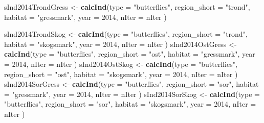 \documentclass[]{article}
\newenvironment{Shaded}{\begin{snugshade}}{\end{snugshade}}
\newcommand{\KeywordTok}[1]{\textcolor[rgb]{0.13,0.29,0.53}{\textbf{#1}}}
\newcommand{\DataTypeTok}[1]{\textcolor[rgb]{0.13,0.29,0.53}{#1}}
\newcommand{\DecValTok}[1]{\textcolor[rgb]{0.00,0.00,0.81}{#1}}
\newcommand{\StringTok}[1]{\textcolor[rgb]{0.31,0.60,0.02}{#1}}
\newcommand{\NormalTok}[1]{#1}
\begin{document}
\begin{Shaded}
\begin{Highlighting}[]
\NormalTok{sInd2014TrondGress <-}\StringTok{ }\KeywordTok{calcInd}\NormalTok{(}\DataTypeTok{type =} \StringTok{"butterflies"}\NormalTok{,}
                              \DataTypeTok{region_short =} \StringTok{"trond"}\NormalTok{,}
                              \DataTypeTok{habitat =} \StringTok{"gressmark"}\NormalTok{,}
                              \DataTypeTok{year =} \DecValTok{2014}\NormalTok{,}
                              \DataTypeTok{nIter =}\NormalTok{ nIter}
\NormalTok{                              )}
       
\NormalTok{sInd2014TrondSkog <-}\StringTok{ }\KeywordTok{calcInd}\NormalTok{(}\DataTypeTok{type =} \StringTok{"butterflies"}\NormalTok{,}
                              \DataTypeTok{region_short =} \StringTok{"trond"}\NormalTok{,}
                              \DataTypeTok{habitat =} \StringTok{"skogsmark"}\NormalTok{,}
                              \DataTypeTok{year =} \DecValTok{2014}\NormalTok{,}
                              \DataTypeTok{nIter =}\NormalTok{ nIter}
\NormalTok{                              )}
\NormalTok{sInd2014OstGress <-}\StringTok{ }\KeywordTok{calcInd}\NormalTok{(}\DataTypeTok{type =} \StringTok{"butterflies"}\NormalTok{,}
                              \DataTypeTok{region_short =} \StringTok{"ost"}\NormalTok{,}
                              \DataTypeTok{habitat =} \StringTok{"gressmark"}\NormalTok{,}
                              \DataTypeTok{year =} \DecValTok{2014}\NormalTok{,}
                              \DataTypeTok{nIter =}\NormalTok{ nIter}
\NormalTok{                              )}
\NormalTok{sInd2014OstSkog <-}\StringTok{ }\KeywordTok{calcInd}\NormalTok{(}\DataTypeTok{type =} \StringTok{"butterflies"}\NormalTok{,}
                              \DataTypeTok{region_short =} \StringTok{"ost"}\NormalTok{,}
                              \DataTypeTok{habitat =} \StringTok{"skogsmark"}\NormalTok{,}
                              \DataTypeTok{year =} \DecValTok{2014}\NormalTok{,}
                              \DataTypeTok{nIter =}\NormalTok{ nIter}
\NormalTok{                              )}
\NormalTok{sInd2014SorGress <-}\StringTok{ }\KeywordTok{calcInd}\NormalTok{(}\DataTypeTok{type =} \StringTok{"butterflies"}\NormalTok{,}
                              \DataTypeTok{region_short =} \StringTok{"sor"}\NormalTok{,}
                              \DataTypeTok{habitat =} \StringTok{"gressmark"}\NormalTok{,}
                              \DataTypeTok{year =} \DecValTok{2014}\NormalTok{,}
                              \DataTypeTok{nIter =}\NormalTok{ nIter}
\NormalTok{                              )}
\NormalTok{sInd2014SorSkog <-}\StringTok{ }\KeywordTok{calcInd}\NormalTok{(}\DataTypeTok{type =} \StringTok{"butterflies"}\NormalTok{,}
                              \DataTypeTok{region_short =} \StringTok{"sor"}\NormalTok{,}
                              \DataTypeTok{habitat =} \StringTok{"skogsmark"}\NormalTok{,}
                              \DataTypeTok{year =} \DecValTok{2014}\NormalTok{,}
                              \DataTypeTok{nIter =}\NormalTok{ nIter}
\NormalTok{                              )}


\end{Highlighting}
\end{Shaded}
\end{document}
